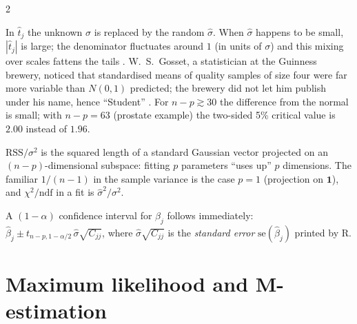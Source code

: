 \begin{paracol}{2}
\begin{intuition}
In $\hat t_j$ the unknown $\sigma$ is replaced by the random $\hat\sigma$. When $\hat\sigma$ happens to be small, $|\hat t_j|$ is
large; the denominator fluctuates around $1$ (in units of $\sigma$) and this mixing over scales fattens the tails
. W.~S.~Gosset, a statistician at the Guinness brewery, noticed that standardised means of
quality samples of size four were far more variable than $N(0,1)$ predicted; the brewery did not let him
publish under his name, hence ``Student'' . For $n-p\gtrsim30$ the
difference from the normal is small; with $n-p=63$ (prostate example) the two-sided 5\% critical value is
$2.00$ instead of $1.96$.
\end{intuition}

\begin{intuition}
$\text{RSS}/\sigma^2$ is the squared length of a standard Gaussian vector projected on an $(n-p)$-dimensional subspace:
fitting $p$ parameters ``uses up'' $p$ dimensions. The familiar $1/(n-1)$ in the sample variance is the case
$p=1$ (projection on $\bm 1$), and $\chi^2/\mathrm{ndf}$ in a fit is $\hat\sigma^2/\sigma^2$.
\end{intuition}

A $(1-\alpha)$ confidence interval for $\beta_j$ follows immediately:
$\hat\beta_j\pm t_{n-p,1-\alpha/2}\,\hat\sigma\sqrt{C_{jj}}$, where $\hat\sigma\sqrt{C_{jj}}$ is the \emph{standard error}
$\mathrm{se}(\hat\beta_j)$ printed by R.

\section{Maximum likelihood and M-estimation}\label{ch05:sec-mle}


\end{paracol}
